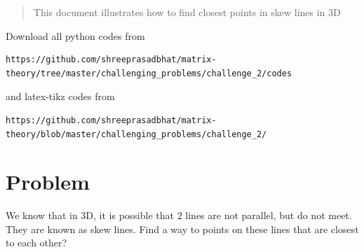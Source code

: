 \documentclass[journal,12pt,twocolumn]{IEEEtran}
\begin{document}
%
\begin{abstract}
This  document  illustrates  how to find closest points in skew lines in 3D
\end{abstract}
Download all python codes from 
%
\begin{lstlisting}
https://github.com/shreeprasadbhat/matrix-theory/tree/master/challenging_problems/challenge_2/codes
\end{lstlisting}
%
and latex-tikz codes from 
%
\begin{lstlisting}
https://github.com/shreeprasadbhat/matrix-theory/blob/master/challenging_problems/challenge_2/
\end{lstlisting}
%
\section{Problem}

We know that in 3D, it is possible that 2 lines are not parallel, but do not meet.  They are known as skew lines. Find a way to points on these lines that are closest to each other?
\end{document}
